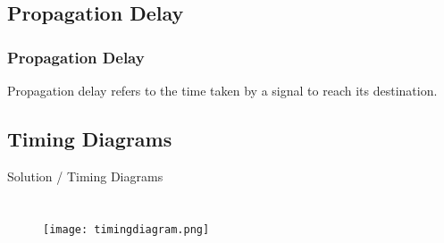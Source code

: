\documentclass{beamer}
\theoremstyle{remark}
\newcommand{\myvec}[1]{\ensuremath{\begin{pmatrix}#1\end{pmatrix}}}
\let\vec\mathbf
\numberwithin{equation}{section}
\begin{document}
\subsection{Propagation Delay}

\begin{frame}
\frametitle{Propagation Delay}

Propagation delay refers to the time taken by a signal to reach its destination.


\end{frame}


\subsection{Timing Diagrams}
\begin{frame}{Solution / Timing Diagrams}
 \begin{center}
\begin{columns}
\vspace{-0.45cm} %
    \begin{figure}[h]
    \centering
   
        
    
    \scalebox{0.55} {\texttt{[image: timingdiagram.png]}} 
    
    \label{fig:graph}
   
\end{figure}

\end{columns}
 \end{center}
\end{frame}
    
\end{document}
